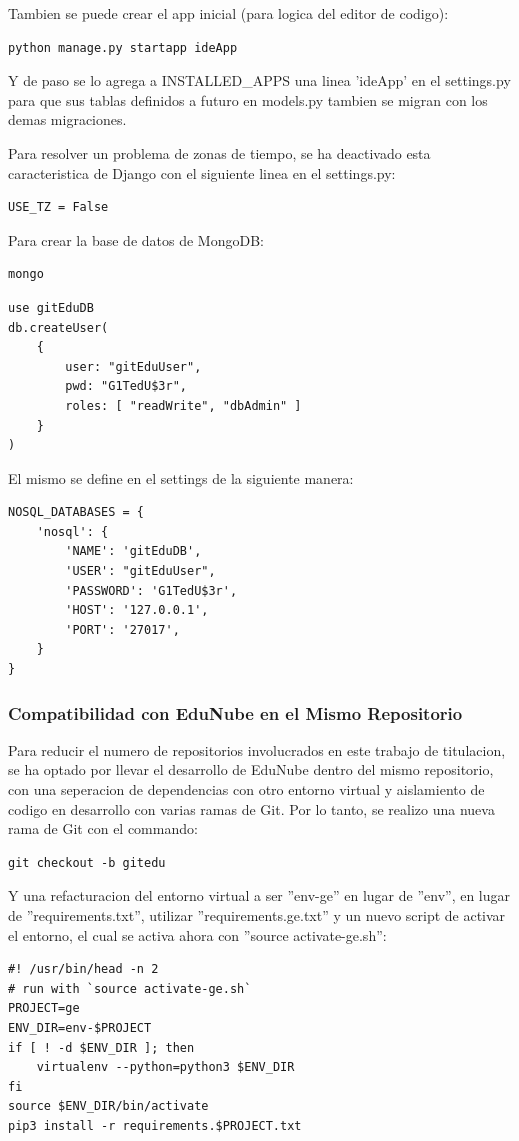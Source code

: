 Tambien se puede crear el app inicial (para logica del editor de codigo):
\begin{lstlisting}
python manage.py startapp ideApp
\end{lstlisting}

Y de paso se lo agrega a INSTALLED\_APPS una linea 'ideApp' en el settings.py para que sus tablas definidos a futuro en models.py tambien se migran con los demas migraciones.

Para resolver un problema de zonas de tiempo, se ha deactivado esta caracteristica de Django con el siguiente linea en el settings.py:
\lstset{language=Python}
\begin{lstlisting}
USE_TZ = False
\end{lstlisting}
\lstset{language=Bash}

Para crear la base de datos de MongoDB:
\begin{lstlisting}
mongo
\end{lstlisting}
\lstset{language=sql}
\begin{lstlisting}
use gitEduDB
db.createUser(
    {
        user: "gitEduUser",
        pwd: "G1TedU$3r",
        roles: [ "readWrite", "dbAdmin" ]
    }
)
\end{lstlisting}
\lstset{language=Bash}

El mismo se define en el settings de la siguiente manera:
\lstset{language=Python}
\begin{lstlisting}
NOSQL_DATABASES = {
    'nosql': {
        'NAME': 'gitEduDB',
        'USER': "gitEduUser",
        'PASSWORD': 'G1TedU$3r',
        'HOST': '127.0.0.1',
        'PORT': '27017',
    }
}
\end{lstlisting}
\lstset{language=Bash}

\subsubsection{Compatibilidad con EduNube en el Mismo Repositorio}
Para reducir el numero de repositorios involucrados en este trabajo de titulacion, se ha optado por llevar el desarrollo de EduNube dentro del mismo repositorio, con una seperacion de dependencias con otro entorno virtual y aislamiento de codigo en desarrollo con varias ramas de Git. Por lo tanto, se realizo una nueva rama de Git con el commando:
\begin{lstlisting}
git checkout -b gitedu
\end{lstlisting}

Y una refacturacion del entorno virtual a ser ''env-ge'' en lugar de ''env'', en lugar de ''requirements.txt'', utilizar ''requirements.ge.txt'' y un nuevo script de activar el entorno, el cual se activa ahora con ''source activate-ge.sh'':
\begin{lstlisting}
#! /usr/bin/head -n 2 
# run with `source activate-ge.sh`
PROJECT=ge
ENV_DIR=env-$PROJECT
if [ ! -d $ENV_DIR ]; then
	virtualenv --python=python3 $ENV_DIR
fi
source $ENV_DIR/bin/activate
pip3 install -r requirements.$PROJECT.txt
\end{lstlisting}

